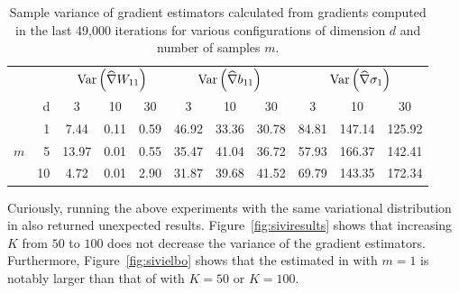 \documentclass[10pt]{article}
\begin{document}
\begin{table}[H]
\centering
\begin{tabular}{@{}rrccccccccc@{}}\toprule
& & \multicolumn{3}{c}{$\mathrm{Var}\left(\widehat\nabla W_{11}\right)$} & \multicolumn{3}{c}{$\mathrm{Var}\left(\widehat\nabla b_{11}\right)$} & \multicolumn{3}{c}{$\mathrm{Var}\left(\widehat\nabla \sigma_1\right)$} \\
\cmidrule(lr){3-5} \cmidrule(lr){6-8} \cmidrule(lr){9-11}
& d & 3 & 10 & 30 & 3 & 10 & 30 & 3 & 10 & 30 \\
\midrule
\multirow{3}{*}{$m$} & 1 & 7.44 & 0.11 & 0.59 & 46.92 & 33.36 & 30.78 & 84.81 & 147.14 & 125.92 \\
& 5 & 13.97 & 0.01 & 0.55 & 35.47 & 41.04 & 36.72 & 57.93 & 166.37 & 142.41 \\
& 10 & 4.72 & 0.01 & 2.90 & 31.87 & 39.68 & 41.52 & 69.79 & 143.35 & 172.34 \\
\bottomrule
\end{tabular}
\caption{Sample variance of \uivi gradient estimators calculated from gradients computed in the last 49,000 \sgd iterations for various configurations of dimension $d$ and number of \mcmc samples $m$.}
\label{tab:variance}
\end{table}

Curiously, running the above experiments with the same variational distribution in \sivi also returned unexpected results. Figure~\ref{fig:siviresults} shows that increasing $K$ from $50$ to $100$ does not decrease the variance of the gradient estimators. Furthermore, Figure~\ref{fig:sivielbo} shows that the estimated \elbo in \uivi with $m=1$ is notably larger than that of \sivi with $K=50$ or $K=100$.
\\
\end{document}
